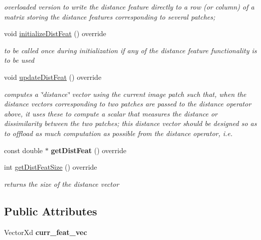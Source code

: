 \begin{DoxyCompactItemize}
\begin{DoxyCompactList}\small\item\em overloaded version to write the distance feature directly to a row (or column) of a matrix storing the distance features corresponding to several patches; \end{DoxyCompactList}\item 
\hypertarget{classSumOfAMs_a92d8372578fb6dec24e3b2eac9e94790}{void \hyperlink{classSumOfAMs_a92d8372578fb6dec24e3b2eac9e94790}{initialize\-Dist\-Feat} () override}\label{classSumOfAMs_a92d8372578fb6dec24e3b2eac9e94790}

\begin{DoxyCompactList}\small\item\em to be called once during initialization if any of the distance feature functionality is to be used \end{DoxyCompactList}\item 
void \hyperlink{classSumOfAMs_ad10c663b837463bb49e6cfaeef9ea45e}{update\-Dist\-Feat} () override
\begin{DoxyCompactList}\small\item\em computes a \char`\"{}distance\char`\"{} vector using the current image patch such that, when the distance vectors corresponding to two patches are passed to the distance operator above, it uses these to compute a scalar that measures the distance or dissimilarity between the two patches; this distance vector should be designed so as to offload as much computation as possible from the distance operator, i.\-e. \end{DoxyCompactList}\item 
\hypertarget{classSumOfAMs_a39b2d2a1e71bc1ad56675ed835baac67}{const double $\ast$ {\bfseries get\-Dist\-Feat} () override}\label{classSumOfAMs_a39b2d2a1e71bc1ad56675ed835baac67}

\item 
\hypertarget{classSumOfAMs_a296234a1f84f8048dcc09f5846b0d773}{int \hyperlink{classSumOfAMs_a296234a1f84f8048dcc09f5846b0d773}{get\-Dist\-Feat\-Size} () override}\label{classSumOfAMs_a296234a1f84f8048dcc09f5846b0d773}

\begin{DoxyCompactList}\small\item\em returns the size of the distance vector \end{DoxyCompactList}\end{DoxyCompactItemize}
\subsection*{Public Attributes}
\begin{DoxyCompactItemize}
\item 
\hypertarget{classSumOfAMs_aecab83e222bd96a024106664cc1398ee}{Vector\-Xd {\bfseries curr\-\_\-feat\-\_\-vec}}\label{classSumOfAMs_aecab83e222bd96a024106664cc1398ee}

\end{DoxyCompactItemize}
